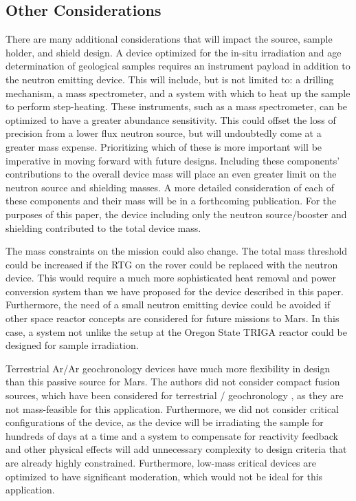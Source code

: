 \documentclass{mc2015}
\begin{document}
\subsection{Other Considerations}
\label{sec:others}

There are many additional considerations that will impact the source, sample holder, and shield design. A device optimized for the in-situ irradiation and age determination of geological samples requires an instrument payload in addition to the neutron emitting device. This will include, but is not limited to: a drilling mechanism, a mass spectrometer, and a system with which to heat up the sample to perform step-heating. These instruments, such as a mass spectrometer, can be optimized to have a greater abundance sensitivity. This could offset the loss of precision from a lower flux neutron source, but will undoubtedly come at a greater mass expense. Prioritizing which of these is more important will be imperative in moving forward with future designs. Including these components' contributions to the overall device mass will place an even greater limit on the neutron source and shielding masses. A more detailed consideration of each of these components and their mass will be in a forthcoming publication. For the purposes of this paper, the device including only the neutron source/booster and shielding contributed to the total device mass. 

The mass constraints on the mission could also change. The total mass threshold could be increased if the RTG on the rover could be replaced with the neutron device. This would require a much more sophisticated heat removal and power conversion system than we have proposed for the device described in this paper. Furthermore, the need of a small neutron emitting device could be avoided if other space reactor concepts are considered for future missions to Mars. In this case, a system not unlike the setup at the Oregon State TRIGA reactor could be designed for sample irradiation.

Terrestrial Ar/Ar geochronology devices have much more flexibility in design than this passive source for Mars. The authors did not consider compact fusion sources, which have been considered for terrestrial / geochronology \cite{renne_application_2005}, as they are not mass-feasible for this application. Furthermore, we did not consider critical configurations of the device, as the device will be irradiating the sample for hundreds of days at a time and a system to compensate for reactivity feedback and other physical effects will add unnecessary complexity to  design criteria that are already highly constrained. Furthermore, low-mass critical devices are optimized to have significant moderation, which would not be ideal for this application. 
\end{document}
